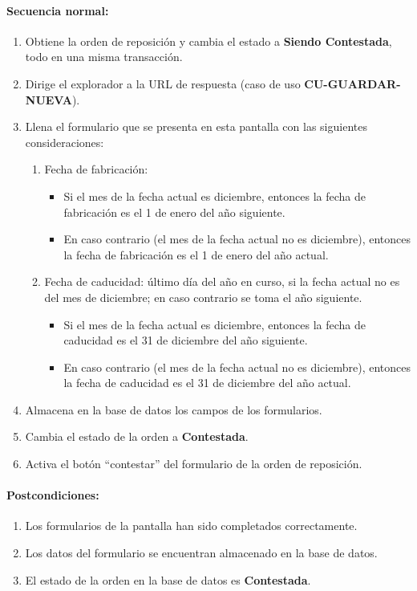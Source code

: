 \paragraph{Secuencia normal:}
\begin{enumerate}
  \item Obtiene la orden de reposición y cambia el estado a \textbf{Siendo Contestada}, todo en una misma transacción.
  \item Dirige el explorador a la URL de respuesta (caso de uso \textbf{CU-GUARDAR-NUEVA}).
  \item Llena el formulario que se presenta en esta pantalla con las siguientes consideraciones:
  \begin{enumerate}
    \item Fecha de fabricación:
    \begin{itemize}
      \item Si el mes de la fecha actual es diciembre, entonces la fecha de fabricación es el 1 de enero del año siguiente.
      \item En caso contrario (el mes de la fecha actual no es diciembre), entonces la fecha de fabricación es el 1 de enero del año actual.
    \end{itemize}
    \item Fecha de caducidad: último día del año en curso, si la fecha actual no es del mes de diciembre; en caso contrario se toma el año siguiente.
    \begin{itemize}
      \item Si el mes de la fecha actual es diciembre, entonces la fecha de caducidad es el 31 de diciembre del año siguiente.
      \item En caso contrario (el mes de la fecha actual no es diciembre), entonces la fecha de caducidad es el 31 de diciembre del año actual.
    \end{itemize}
  \end{enumerate}
  \item Almacena en la base de datos los campos de los formularios.
  \item Cambia el estado de la orden a \textbf{Contestada}.
  \item Activa el botón ``contestar'' del formulario de la orden de reposición.
\end{enumerate}
\paragraph{Postcondiciones:}
\begin{enumerate}
  \item Los formularios de la pantalla han sido completados correctamente.
  \item Los datos del formulario se encuentran almacenado en la base de datos.
  \item El estado de la orden en la base de datos es \textbf{Contestada}.
\end{enumerate}
